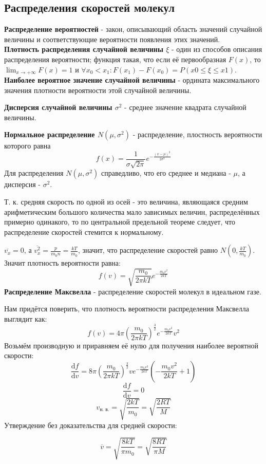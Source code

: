 \subsection{Распределения скоростей молекул}
\textbf{Распределение вероятностей} - закон, описывающий область значений случайной величины и соответствующие вероятности появления этих значений.\\
\textbf{Плотность распределения случайной величины $\xi$} - один из способов описания распределения вероятности; функция такая, что если её первообразная $F(x)$, то
$\lim_{x\to+\infty}{F(x)}=1$ и $\forall x_0<x_1 : F(x_1)-F(x_0)=P(x0 \le \xi \le x1)$.\\
\textbf{Наиболее вероятное значение случайной величины} - ордината максимального значения плотности вероятности этой случайной величины.\par
\textbf{Дисперсия случайной величины $\sigma^2$} - среднее значение квадрата случайной величины.\par
\textbf{Нормальное распределение $N(\mu, \sigma^2)$} - распределение, плостность вероятности которого равна
\[f(x)=\frac{1}{\sigma \sqrt{2\pi}}e^{-\frac{(x-\mu)^2}{2\sigma^2}}\]
Для распределения $N(\mu, \sigma^2)$ справедливо, что его среднее и медиана - $\mu$, а дисперсия - $\sigma^2$.\par
Т. к. средняя скорость по одной из осей - это величина, являющаяся средним арифметическим большого количества мало зависимых величин, распределённых примерно одинакого, то по центральной предельной теореме следует, что распределение скоростей стемится к нормальному.\par
$\overline{v_x}=0$, а $\overline{v_x^2}=\frac{p}{m_0 n}=\frac{kT}{m_0}$, значит, что распределение скоростей равно $N(0, \frac{kT}{m_0})$. Значит плотность вероятности равна:
\[f(v)=\sqrt{\frac{m_0}{2\pi kT}}e^{-\frac{m_0 v^2}{2kT}}\]
\textbf{Распределение Максвелла} - распределение скоростей молекул в идеальном газе.\par
Нам придётся поверить, что плотность вероятности распределения Максвелла выглядит как:
\[f(v) = 4\pi(\frac{m_0}{2\pi k T})^{\frac{3}{2}}e^{-\frac{m_0v^2}{2 k T}}v^2\]
Возьмём производную и приравняем её нулю для получения наиболее вероятной скорости:
\[\frac{\text{d}f}{\text{d}v}=8\pi(\frac{m_0}{2\pi k T})^{\frac{3}{2}}ve^{-\frac{m_0v^2}{2 k T}}(-\frac{m_0 v^2}{2kT}+1)\]
\[\frac{\text{d}f}{\text{d}v}=0\]
\[v_{\text{н. в.}}=\sqrt{\frac{2kT}{m_0}}=\sqrt{\frac{2RT}{M}}\]
Утверждение без доказательства для средней скорости:\par
\[\overline{v}=\sqrt{\frac{8kT}{\pi m_0}}=\sqrt{\frac{8RT}{\pi M}}\]



